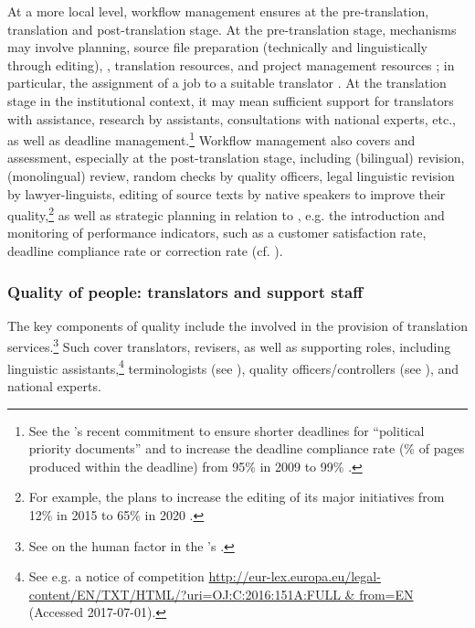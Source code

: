 \documentclass[output=paper]{langsci/langscibook}
\begin{document}
\largerpage 
At a more local level, workflow management ensures  at the pre-translation, translation and post-translation stage. At the pre-translation stage,  mechanisms may involve planning, source file preparation (technically and linguistically through editing), , translation resources, and project management resources \citep[77--79]{Drugan2013}; in particular, the assignment of a job to a suitable translator \citep[23]{PrietoRamos2015}. At the translation stage in the institutional context, it may mean sufficient support for translators with  assistance, research by assistants, consultations with national experts, etc., as well as deadline management.\footnote{See the \citeauthor{DGT2016b}’s recent commitment to ensure shorter deadlines for “political priority documents'' and to increase the deadline compliance rate (\% of pages produced within the deadline) from 95\% in 2009 to 99\% \citep[6, 9]{DGT2016b}.} Workflow management also covers  and assessment, especially at the post-translation stage, including (bilingual) revision, (monolingual) review, random checks by quality officers, legal linguistic revision by lawyer-linguists, editing of source texts by native speakers to improve their quality,\footnote{For example, the  plans to increase the editing of its major initiatives from 12\% in 2015 to 65\% in 2020 \citep{DGT2016b}.} as well as strategic planning in relation to , e.g. the introduction and monitoring of performance indicators, such as a customer satisfaction rate, deadline compliance rate or correction rate (cf. \citealt{DGT2016b}). 

\subsubsection{Quality of people: translators and support staff}\label{sec:biel:3.2.3 }

The key components of quality include the  involved in the provision of translation services.\footnote{See \citet{Svoboda2008} on the human factor in the ’s .} Such  cover translators, revisers, as well as supporting roles, including linguistic assistants,\footnote{See e.g. a notice of competition \url{http://eur-lex.europa.eu/legal-content/EN/TXT/HTML/?uri=OJ:C:2016:151A:FULL & from=EN} (Accessed 2017-07-01).} terminologists (see ), quality officers/controllers (see \citealt{Druganforthcoming}), and national experts. 
\end{document}
